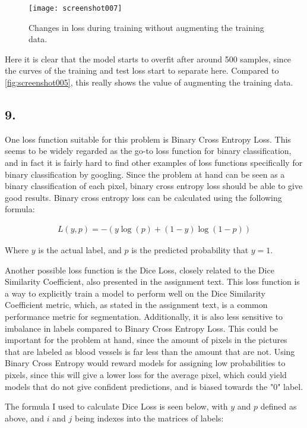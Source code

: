\documentclass[a4paper, 12pt]{article}
\begin{document}
\begin{figure}[H]
	\centering
	\texttt{[image: screenshot007]}
	\caption{Changes in loss during training without augmenting the training data.}
	\label{fig:screenshot007}
\end{figure}

Here it is clear that the model starts to overfit after around 500 samples, since the curves of the training and test loss start to separate here. Compared to \autoref{fig:screenshot005}, this really shows the value of augmenting the training data.


\subsection{9.}

One loss function suitable for this problem is Binary Cross Entropy Loss. This seems to be widely regarded as the go-to loss function for binary classification, and in fact it is fairly hard to find other examples of loss functions specifically for binary classification by googling. Since the problem at hand can be seen as a binary classification of each pixel, binary cross entropy loss should be able to give good results. Binary cross entropy loss can be calculated using the following formula:

\begin{align}
	L(y, p) = -(y \log(p) + (1 - y) \log(1-p))
\end{align}

Where $y$ is the actual label, and $p$ is the predicted probability that $y=1$.

Another possible loss function is the Dice Loss, closely related to the Dice Similarity Coefficient, also presented in the assignment text. This loss function is a way to explicitly train a model to perform well on the Dice Similarity Coefficient metric, which, as stated in the assignment text, is a common performance metric for segmentation. Additionally, it is also less sensitive to imbalance in labels compared to Binary Cross Entropy Loss. This could be important for the problem at hand, since the amount of pixels in the pictures that are labeled as blood vessels is far less than the amount that are not. Using Binary Cross Entropy would reward models for assigning low probabilities to pixels, since this will give a lower loss for the average pixel, which could yield models that do not give confident predictions, and is biased towards the "0" label.

The formula I used to calculate Dice Loss is seen below, with $y$ and $p$ defined as above, and $i$ and $j$ being indexes into the matrices of labels:
\end{document}
